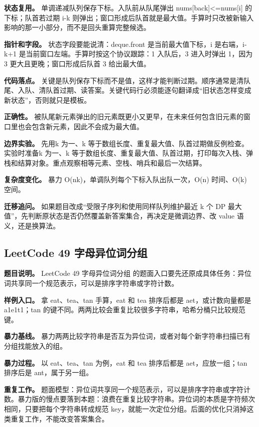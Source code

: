 \textbf{状态复用。} 单调递减队列保存下标。入队前从队尾弹出 nums[back]<=nums[i] 的下标；队首若过期 i-k 则弹出；窗口形成后队首就是最大值。手算时只改被新输入影响的那一小部分，而不是回头重算完整候选。

\textbf{指针和字段。} 状态字段要能说清：deque.front 是当前最大值下标，i 是右端，i-k+1 是当前窗口左端。手算时按这个协议跟踪：1 入队后，3 进入时弹出 1，因为 3 更大且更晚；窗口形成后队首 3 给出最大值。

\textbf{代码落点。} 关键是队列保存下标而不是值，这样才能判断过期。顺序通常是清队尾、入队、清队首过期、读答案。关键代码行必须能逐句翻译成“旧状态怎样变成新状态”，否则就只是模板。

\textbf{正确性。} 被队尾新元素弹出的旧元素既更小又更早，在未来任何包含旧元素的窗口里也会包含新元素，因此不会成为最大值。

\textbf{边界实验。} 先用k 为一、k 等于数组长度、重复最大值、队首过期做反例检查。实验时准备k 为一、k 等于数组长度、重复最大值、队首过期，打印每次入栈、弹栈和结算对象。重点观察相等元素、空栈、哨兵和最后一次结算。

\textbf{复杂度变化。} 暴力 O(nk)，单调队列每个下标入队出队一次，O(n) 时间、O(k) 空间。

\textbf{迁移追问。} 如果题目改成“受限子序列和使用同样队列维护最近 k 个 DP 最大值”，先判断原状态是否仍然覆盖新答案集合，再决定是微调边界、改 value 语义，还是换算法。

\subsection{LeetCode 49 字母异位词分组}

\textbf{题目说明。} LeetCode 49 字母异位词分组 的题面入口要先还原成具体任务：异位词共享同一个规范表示，可以是排序字符串或字符计数。

\textbf{样例入口。} 拿 eat、tea、tan 手算，eat 和 tea 排序后都是 aet，或计数向量都是 a1e1t1；tan 的键不同。两两比较会重复比较很多字符串，哈希分桶只比较规范键。

\textbf{暴力基线。} 暴力两两比较字符串是否互为异位词，或者对每个新字符串扫描已有分组找能放入的组。

\textbf{暴力过程。} 以 eat、tea、tan 为例，eat 和 tea 排序后都是 aet，应放一组；tan 排序后是 ant，属于另一组。

\textbf{重复工作。} 题面模型：异位词共享同一个规范表示，可以是排序字符串或字符计数。暴力版的慢点要落到本题：浪费在重复比较字符串。异位词的本质是字符频次相同，只要把每个字符串转成规范 key，就能一次定位分组。后面的优化只消掉这类重复工作，不能改变答案集合。

